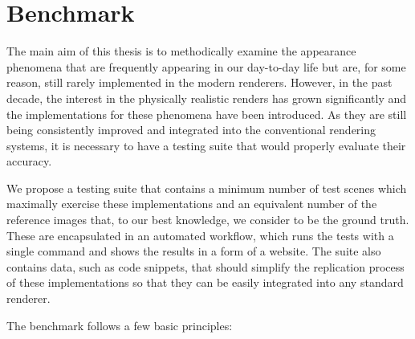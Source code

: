 \chapter{Benchmark}
\label{chap:benchmark}

The main aim of this thesis is to methodically examine the appearance phenomena that are frequently appearing in our day-to-day life but are, for some reason, still rarely implemented in the modern renderers. However, in the past decade, the interest in the physically realistic renders has grown significantly and the implementations for these phenomena have been introduced. As they are still being consistently improved and integrated into the conventional rendering systems, it is necessary to have a testing suite that would properly evaluate their accuracy.

We propose a testing suite that contains a minimum number of test scenes which maximally exercise these implementations and an equivalent number of the reference images that, to our best knowledge, we consider to be the ground truth. These are encapsulated in an automated workflow, which runs the tests with a single command and shows the results in a form of a website. The suite also contains data, such as code snippets, that should simplify the replication process of these implementations so that they can be easily integrated into any standard renderer.

The benchmark follows a few basic principles:

